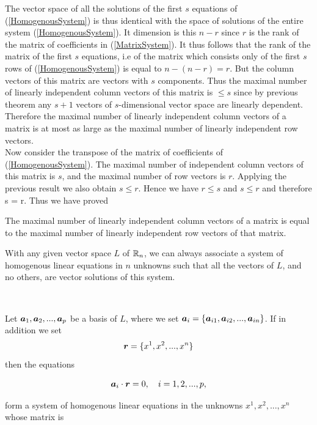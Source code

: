 The vector space of all the solutions of the first $s$ equations of (\ref{HomogenousSystem}) is thus identical with the space of solutions of the entire system (\ref{HomogenousSystem}). It dimension is this $n-r$
since $r$ is the rank of the matrix of coefficients in (\ref{MatrixSystem}). It thus follows that the rank of the matrix of the first $s$ equations, i.e of the matrix which consists only of the first $s$ rows of (\ref{HomogenousSystem})
is equal to $n - (n-r) = r$. But the column vectors of this matrix are vectors with $s$ components. Thus the maximal number of linearly independent column vectors of this matrix is $\le s$ since by previous theorem
any $s+1$ vectors of $s$-dimensional vector space are linearly dependent. \\

Therefore the maximal number of linearly independent column vectors of a matrix is at most as large as the maximal number of linearly independent row vectors. \\

Now consider the transpose of the matrix of coefficients of (\ref{HomogenousSystem}). The maximal number of independent column vectors of this matrix is $s$, and the maximal number of row vectors is $r$.
Applying the previous result we also obtain $s\le r$. Hence we have $r \le s$ and $s\le r$ and therefore s = r. Thus we have proved

\begin{theorem}
The maximal number of linearly independent column vectors of a matrix is equal to the maximal number of linearly independent row vectors of that matrix. 
\end{theorem}

\begin{theorem}
With any given vector space $L$ of $\mathbb{R}_n$, we can always associate a system of homogenous linear equations in $n$ unknowns such that all the vectors of $L$, and no others, are vector solutions of this system.
\end{theorem}\

Let $\boldsymbol{a}_1, \boldsymbol{a}_2, ..., \boldsymbol{a}_p$ be a basis of $L$, where we set $\boldsymbol{a}_i = \{\boldsymbol{a}_{i1}, \boldsymbol{a}_{i2}, ..., \boldsymbol{a}_{in}\}$. If in addition we set 
$$\boldsymbol{r} = \{ x^1, x^2, ..., x^n\}$$ then the equations 

\begin{equation}\boldsymbol{a}_i \cdot \boldsymbol{r} = 0, \quad i = 1, 2, ..., p,\label{10}\end{equation}

form a system of homogenous linear equations in the unknowns $x^1, x^2, ..., x^n$ whose matrix is

